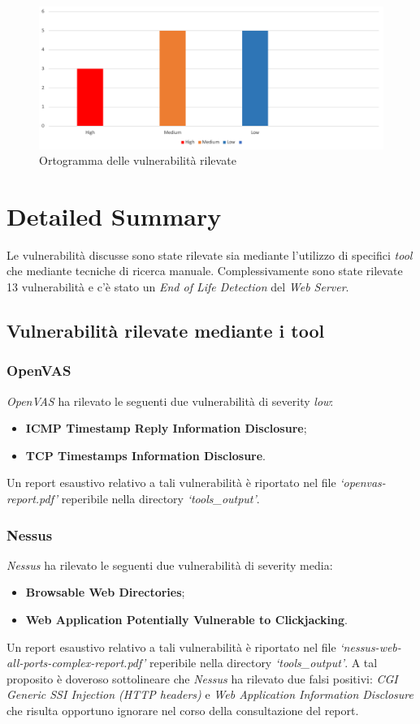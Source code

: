 \documentclass[a4paper,11pt,oneside,top=3cm,bottom=3cm,left=3.5cm,right=3.5cm,openright,reqno,table]{book}
\begin{document}
\begin{figure}[h]
    \centering
    \includegraphics[scale=0.3]{capitoli/images/ortogramma.png}
    \caption{Ortogramma delle vulnerabilità rilevate}
    \label{fig:istogramma}
\end{figure}
\section{Detailed Summary}
Le vulnerabilità discusse sono state rilevate sia mediante l'utilizzo di specifici \emph{tool} che mediante tecniche di ricerca manuale. Complessivamente sono state rilevate 13 vulnerabilità e c'è stato un \emph{End of Life Detection} del \emph{Web Server}. 
\subsection{Vulnerabilità rilevate mediante i tool}
\subsubsection{OpenVAS}
\emph{OpenVAS} ha rilevato le seguenti due vulnerabilità di severity \emph{low}:
\begin{itemize}
    \item \textbf{ICMP Timestamp Reply Information Disclosure};
    \item \textbf{TCP Timestamps Information Disclosure}.
\end{itemize}
Un report esaustivo relativo a tali vulnerabilità è riportato nel file \emph{`openvas-report.pdf'} reperibile nella directory \emph{`tools\_output'}.
\subsubsection{Nessus}
\emph{Nessus} ha rilevato le seguenti due vulnerabilità di severity media:
\begin{itemize}
    \item \textbf{Browsable Web Directories};
    \item \textbf{Web Application Potentially Vulnerable to Clickjacking}.
\end{itemize}
Un report esaustivo relativo a tali vulnerabilità è riportato nel file \emph{`nessus-web-all-ports-complex-report.pdf'} reperibile nella directory \emph{`tools\_output'}. A tal proposito è doveroso sottolineare che \emph{Nessus} ha rilevato due falsi positivi: \emph{CGI Generic SSI Injection (HTTP headers)} e \emph{Web Application Information Disclosure} che risulta opportuno ignorare nel corso della consultazione del report.
\end{document}
